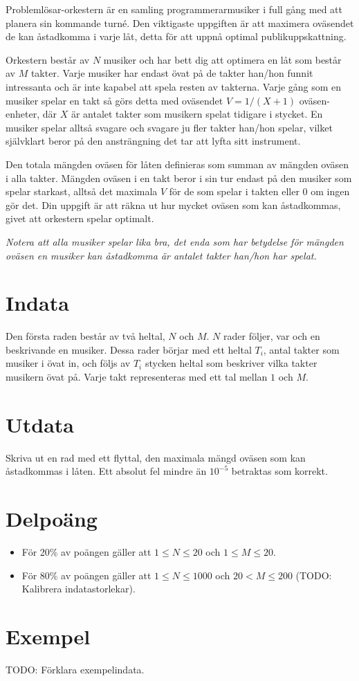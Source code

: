
Problemlösar-orkestern är en samling programmerarmusiker i full gång med att planera sin kommande turné. Den viktigaste uppgiften är att maximera oväsendet de kan åstadkomma i varje låt, detta för att uppnå optimal publikuppskattning.

Orkestern består av $N$ musiker och har bett dig att optimera en låt som består av $M$ takter. Varje musiker har endast övat på de takter han/hon funnit intressanta och är inte kapabel att spela resten av takterna. Varje gång som en musiker spelar en takt så görs detta med oväsendet $V=1/(X+1)$ oväsen-enheter, där $X$ är antalet takter som musikern spelat tidigare i stycket. En musiker spelar alltså svagare och svagare ju fler takter han/hon spelar, vilket självklart beror på den ansträngning det tar att lyfta sitt instrument.

Den totala mängden oväsen för låten definieras som summan av mängden oväsen i alla takter. Mängden oväsen i en takt beror i sin tur endast på den musiker som spelar starkast, alltså det maximala $V$ för de som spelar i takten eller $0$ om ingen gör det. Din uppgift är att räkna ut hur mycket oväsen som kan åstadkommas, givet att orkestern spelar optimalt.

\emph{Notera att alla musiker spelar lika bra, det enda som har betydelse för mängden oväsen en musiker kan åstadkomma är antalet takter han/hon har spelat.}

\section*{Indata}
Den första raden består av två heltal, $N$ och $M$. $N$ rader följer, var och en beskrivande en musiker. Dessa rader börjar med ett heltal $T_i$, antal takter som musiker i övat in, och följs av $T_i$ stycken heltal som beskriver vilka takter musikern övat på. Varje takt representeras med ett tal mellan $1$ och $M$.

\section*{Utdata}
Skriva ut en rad med ett flyttal, den maximala mängd oväsen som kan åstadkommas i låten. Ett absolut fel mindre än $10^{-5}$ betraktas som korrekt.

\section*{Delpoäng}
\begin{itemize}
\item För 20\% av poängen gäller att $1 \leq N \leq 20$ och $1 \leq M \leq 20$.
\item För 80\% av poängen gäller att $1 \leq N \leq 1000$ och $20 < M \leq 200$ (TODO: Kalibrera indatastorlekar).
\end{itemize}

\section*{Exempel}
TODO: Förklara exempelindata.
